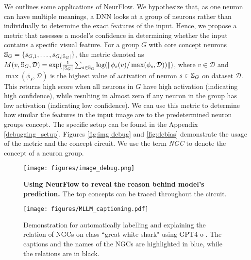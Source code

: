 We outlines some applications of NeurFlow.
We hypothesize that, as one neuron can have multiple meanings, a DNN looks at a group of neurons rather than individually to determine the exact features of the input. Hence, we propose a metric that assesses a model's confidence in determining whether the input contains a specific visual feature. For a group $G$ with core concept neurons ${\mathbb{S}}_G = \{s_{G,1}, \dots, s_{G, |{\mathbb{S}}_G|}\}$, the metric denoted as $ M(v, {\mathbb{S}}_G, \mathcal{D}) = \exp(\frac{1}{|{\mathbb{S}}_G|}\sum_{s \in {\mathbb{S}}_G}\log(\|\phi_s(v)/\max(\phi_s, \mathcal{D}))\|)$, where $v \in \mathcal{D}$ and $\max(\phi_s, \mathcal{D})$ is the highest value of activation of neuron $s \in {\mathbb{S}}_G$ on dataset $\mathcal{D}$.
This returns high score when all neurons in $G$ have high activation (indicating high confidence), while resulting in almost zero if any neuron in the group has low activation (indicating low confidence). We can use this metric to determine how similar the features in the input image are to the predetermined neuron groups concept. 
The specific setup can be found in the Appendix \ref{debugging_setup}. Figures \ref{fig:img debug} and \ref{fig:debias} demonstrate the usage of the metric and the concept circuit.
We use the term \emph{NGC} to denote the concept of a neuron group. 
\begin{figure}[t]
    \centering
    \begin{minipage}{.45\textwidth}
       \vspace{-12mm}
        \texttt{[image: figures/image\_debug.png]}
        \caption{\textbf{Using NeurFlow to reveal the reason behind model's prediction.} The top concepts can be traced throughout the circuit.}\label{fig:img debug}   
        \vspace{-10pt}
    \end{minipage}
    \hfill
    \begin{minipage}{.5\textwidth}
        \vspace{-12mm}
        \texttt{[image: figures/MLLM\_captioning.pdf]}
        \caption{Demonstration for automatically labelling and explaining the relation of NGCs on class ``great white shark" using GPT4-o \citep{Gpt4o}. The captions and the names of the NGCs are highlighted in blue, while the relations are in black.} \label{fig:captioning}
        \vspace{-10pt}
    \end{minipage}
    \vspace{-5pt}
\end{figure}

